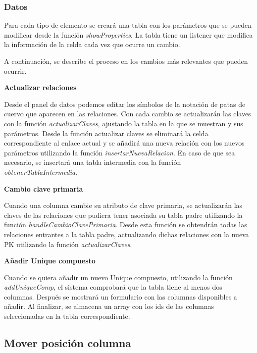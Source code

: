 \subsubsection{Datos}

Para cada tipo de elemento se creará una tabla con los parámetros que se pueden modificar desde la función \emph{showProperties}. La tabla tiene un listener que modifica la información de la celda cada vez que ocurre un cambio.

A continuación, se describe el proceso en los cambios más relevantes que pueden ocurrir.

\textbf{Actualizar relaciones}

Desde el panel de datos podemos editar los símbolos de la notación de patas de cuervo que aparecen en las relaciones. Con cada cambio se actualizarán las claves con la función \emph{actualizarClaves}, ajustando la tabla en la que se muestran y sus parámetros. Desde la función actualizar claves se eliminará la celda correspondiente al enlace actual y se añadirá una nueva relación con los nuevos parámetros utilizando la función \emph{insertarNuevaRelacion}. En caso de que sea necesario, se insertará una tabla intermedia con la función \emph{obtenerTablaIntermedia}.


\textbf{Cambio clave primaria}

Cuando una columna cambie su atributo de clave primaria, se actualizarán las claves de las relaciones que pudiera tener asociada su tabla padre utilizando la función \emph{handleCambioClavePrimaria}. Desde esta función se obtendrán todas las relaciones entrantes a la tabla padre, actualizando dichas relaciones con la nueva PK utilizando la función \emph{actualizarClaves}.


\textbf{Añadir Unique compuesto}

Cuando se quiera añadir un nuevo Unique compuesto, utilizando la función \emph{addUniqueComp}, el sistema comprobará que la tabla tiene al menos dos columnas. Después se mostrará un formulario con las columnas disponibles a añadir. Al finalizar, se almacena un array con los ids de las columnas seleccionadas en la tabla correspondiente.

\subsection{Mover posición columna}

